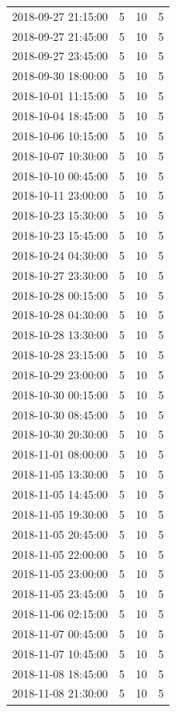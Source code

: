 \begin{tabular}{lrrr}
2018-09-27 21:15:00 & 5 & 10 & 5 \\
2018-09-27 21:45:00 & 5 & 10 & 5 \\
2018-09-27 23:45:00 & 5 & 10 & 5 \\
2018-09-30 18:00:00 & 5 & 10 & 5 \\
2018-10-01 11:15:00 & 5 & 10 & 5 \\
2018-10-04 18:45:00 & 5 & 10 & 5 \\
2018-10-06 10:15:00 & 5 & 10 & 5 \\
2018-10-07 10:30:00 & 5 & 10 & 5 \\
2018-10-10 00:45:00 & 5 & 10 & 5 \\
2018-10-11 23:00:00 & 5 & 10 & 5 \\
2018-10-23 15:30:00 & 5 & 10 & 5 \\
2018-10-23 15:45:00 & 5 & 10 & 5 \\
2018-10-24 04:30:00 & 5 & 10 & 5 \\
2018-10-27 23:30:00 & 5 & 10 & 5 \\
2018-10-28 00:15:00 & 5 & 10 & 5 \\
2018-10-28 04:30:00 & 5 & 10 & 5 \\
2018-10-28 13:30:00 & 5 & 10 & 5 \\
2018-10-28 23:15:00 & 5 & 10 & 5 \\
2018-10-29 23:00:00 & 5 & 10 & 5 \\
2018-10-30 00:15:00 & 5 & 10 & 5 \\
2018-10-30 08:45:00 & 5 & 10 & 5 \\
2018-10-30 20:30:00 & 5 & 10 & 5 \\
2018-11-01 08:00:00 & 5 & 10 & 5 \\
2018-11-05 13:30:00 & 5 & 10 & 5 \\
2018-11-05 14:45:00 & 5 & 10 & 5 \\
2018-11-05 19:30:00 & 5 & 10 & 5 \\
2018-11-05 20:45:00 & 5 & 10 & 5 \\
2018-11-05 22:00:00 & 5 & 10 & 5 \\
2018-11-05 23:00:00 & 5 & 10 & 5 \\
2018-11-05 23:45:00 & 5 & 10 & 5 \\
2018-11-06 02:15:00 & 5 & 10 & 5 \\
2018-11-07 00:45:00 & 5 & 10 & 5 \\
2018-11-07 10:45:00 & 5 & 10 & 5 \\
2018-11-08 18:45:00 & 5 & 10 & 5 \\
2018-11-08 21:30:00 & 5 & 10 & 5 \\

\end{tabular}

